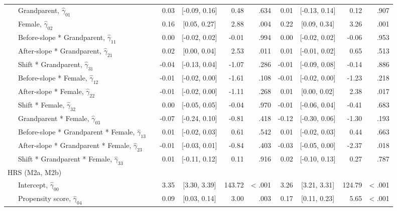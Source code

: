 \documentclass[
  english,
  man, noextraspace]{apa7}
\newenvironment{lltable}{\begin{landscape}\begin{center}\begin{ThreePartTable}}{\end{ThreePartTable}\end{center}\end{landscape}}
\begin{document}
\begin{lltable}
{\begin{longtable}{lrcrrrcrr}
\ \ \ Grandparent, $\hat{\gamma}_{01}$ \textcolor{white}{L} & 0.03 & [-0.09, 0.16] & 0.48 & .634 & 0.01 & [-0.13, 0.14] & 0.12 & .907\\
\ \ \ Female, $\hat{\gamma}_{02}$ \textcolor{white}{L} & 0.16 & [0.05, 0.27] & 2.88 & .004 & 0.22 & [0.09, 0.34] & 3.26 & .001\\
\ \ \ Before-slope * Grandparent, $\hat{\gamma}_{11}$ \textcolor{white}{L} & 0.00 & [-0.02, 0.02] & -0.01 & .994 & 0.00 & [-0.02, 0.02] & -0.06 & .953\\
\ \ \ After-slope * Grandparent, $\hat{\gamma}_{21}$ \textcolor{white}{L} & 0.02 & [0.00, 0.04] & 2.53 & .011 & 0.01 & [-0.01, 0.02] & 0.65 & .513\\
\ \ \ Shift * Grandparent, $\hat{\gamma}_{31}$ \textcolor{white}{L} & -0.04 & [-0.13, 0.04] & -1.07 & .286 & -0.01 & [-0.09, 0.08] & -0.14 & .886\\
\ \ \ Before-slope * Female, $\hat{\gamma}_{12}$ \textcolor{white}{L} & -0.01 & [-0.02, 0.00] & -1.61 & .108 & -0.01 & [-0.02, 0.00] & -1.23 & .218\\
\ \ \ After-slope * Female, $\hat{\gamma}_{22}$ \textcolor{white}{L} & -0.01 & [-0.02, 0.00] & -1.11 & .268 & 0.01 & [0.00, 0.02] & 2.38 & .017\\
\ \ \ Shift * Female, $\hat{\gamma}_{32}$ \textcolor{white}{L} & 0.00 & [-0.05, 0.05] & -0.04 & .970 & -0.01 & [-0.06, 0.04] & -0.41 & .683\\
\ \ \ Grandparent * Female, $\hat{\gamma}_{03}$ \textcolor{white}{L} & -0.07 & [-0.24, 0.10] & -0.81 & .418 & -0.12 & [-0.30, 0.06] & -1.30 & .193\\
\ \ \ Before-slope * Grandparent * Female, $\hat{\gamma}_{13}$ \textcolor{white}{L} & 0.01 & [-0.02, 0.03] & 0.61 & .542 & 0.01 & [-0.02, 0.03] & 0.44 & .663\\
\ \ \ After-slope * Grandparent * Female, $\hat{\gamma}_{23}$ \textcolor{white}{L} & -0.01 & [-0.03, 0.01] & -0.84 & .403 & -0.03 & [-0.05, 0.00] & -2.37 & .018\\
\ \ \ Shift * Grandparent * Female, $\hat{\gamma}_{33}$ \textcolor{white}{L} & 0.01 & [-0.11, 0.12] & 0.11 & .916 & 0.02 & [-0.10, 0.13] & 0.27 & .787\\
HRS (M2a, M2b) &  &  &  &  &  &  &  & \\
\ \ \ Intercept, $\hat{\gamma}_{00}$ \textcolor{white}{H} & 3.35 & [3.30, 3.39] & 143.72 & < .001 & 3.26 & [3.21, 3.31] & 124.79 & < .001\\
\ \ \ Propensity score, $\hat{\gamma}_{04}$ \textcolor{white}{H} & 0.09 & [0.03, 0.14] & 3.00 & .003 & 0.17 & [0.11, 0.23] & 5.65 & < .001\\

\end{longtable}}
\end{lltable}
\end{document}
